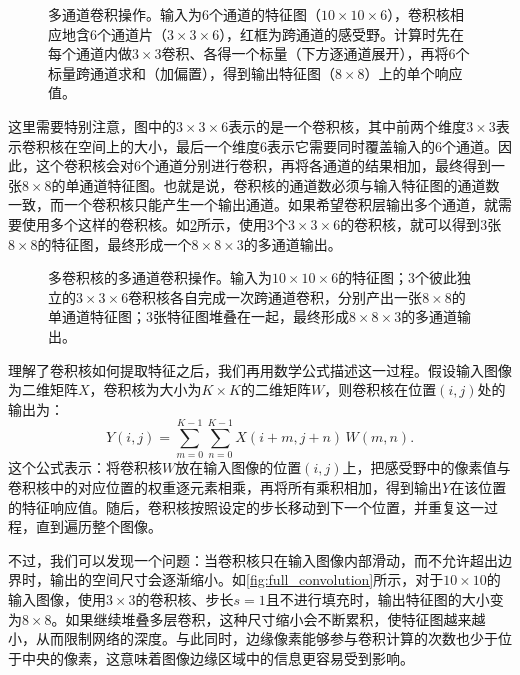 \begin{figure}[H]
    \caption{多通道卷积操作。输入为6个通道的特征图（$10\times 10\times 6$），卷积核相应地含6个通道片（$3\times 3\times 6$），红框为跨通道的感受野。计算时先在每个通道内做$3\times 3$卷积、各得一个标量（下方逐通道展开），再将6个标量跨通道求和（加偏置），得到输出特征图（$8\times 8$）上的单个响应值。}
    \label{fig:multi_channel_convolution}
\end{figure}

这里需要特别注意，图中的$3\times3\times6$表示的是一个卷积核，其中前两个维度$3\times3$表示卷积核在空间上的大小，最后一个维度$6$表示它需要同时覆盖输入的$6$个通道。因此，这个卷积核会对6个通道分别进行卷积，再将各通道的结果相加，最终得到一张$8\times8$的单通道特征图。也就是说，卷积核的通道数必须与输入特征图的通道数一致，而一个卷积核只能产生一个输出通道。如果希望卷积层输出多个通道，就需要使用多个这样的卷积核。如\cref{fig:multi_channel_output}所示，使用$3$个$3\times3\times6$的卷积核，就可以得到$3$张$8\times8$的特征图，最终形成一个$8\times8\times3$的多通道输出。

\begin{figure}[H]
    \caption{多卷积核的多通道卷积操作。输入为$10\times 10\times 6$的特征图；3个彼此独立的$3\times 3\times 6$卷积核各自完成一次跨通道卷积，分别产出一张$8\times 8$的单通道特征图；3张特征图堆叠在一起，最终形成$8\times 8\times 3$的多通道输出。}
    \label{fig:multi_channel_output}
\end{figure}

理解了卷积核如何提取特征之后，我们再用数学公式描述这一过程。假设输入图像为二维矩阵$X$，卷积核为大小为$K\times K$的二维矩阵$W$，则卷积核在位置$(i,j)$处的输出为：
$$
Y(i,j)=\sum_{m=0}^{K-1}\sum_{n=0}^{K-1}X(i+m,j+n)\,W(m,n).
$$
这个公式表示：将卷积核$W$放在输入图像的位置$(i,j)$上，把感受野中的像素值与卷积核中的对应位置的权重逐元素相乘，再将所有乘积相加，得到输出$Y$在该位置的特征响应值。随后，卷积核按照设定的步长移动到下一个位置，并重复这一过程，直到遍历整个图像。

不过，我们可以发现一个问题：当卷积核只在输入图像内部滑动，而不允许超出边界时，输出的空间尺寸会逐渐缩小。如\cref{fig:full_convolution}所示，对于$10\times10$的输入图像，使用$3\times3$的卷积核、步长$s=1$且不进行填充时，输出特征图的大小变为$8\times8$。如果继续堆叠多层卷积，这种尺寸缩小会不断累积，使特征图越来越小，从而限制网络的深度。与此同时，边缘像素能够参与卷积计算的次数也少于位于中央的像素，这意味着图像边缘区域中的信息更容易受到影响。

